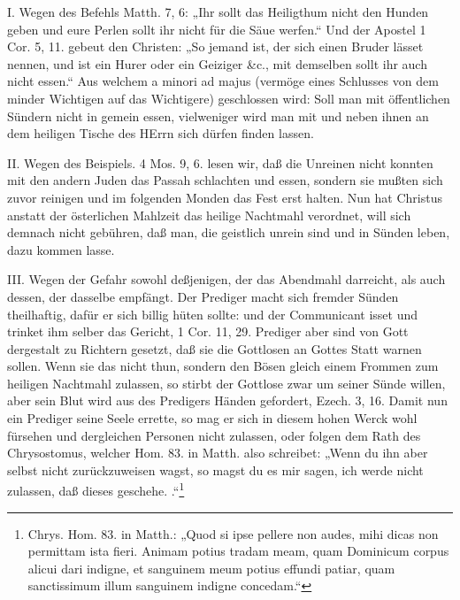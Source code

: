 I. Wegen des Befehls Matth. 7, 6: „Ihr sollt das Heiligthum nicht den Hunden geben und eure Perlen sollt ihr nicht für die Säue werfen.“ Und der Apostel 1 Cor. 5, 11. gebeut den Christen: „So jemand ist, der sich einen Bruder lässet nennen, und ist ein Hurer oder ein Geiziger \&c., mit demselben
sollt ihr auch nicht essen.“ Aus welchem a minori ad majus (vermöge eines Schlusses von dem minder Wichtigen auf das Wichtigere) geschlossen wird: Soll man mit öffentlichen Sündern nicht in gemein essen, vielweniger wird man mit und neben ihnen an dem heiligen Tische des HErrn sich dürfen finden lassen.

II. Wegen des Beispiels. 4 Mos. 9, 6. lesen wir, daß die Unreinen nicht konnten mit den andern Juden das Passah schlachten und essen, sondern sie mußten sich zuvor reinigen und im folgenden Monden das Fest erst halten. Nun hat Christus anstatt der österlichen Mahlzeit das heilige Nachtmahl verordnet, will sich demnach nicht gebühren, daß man, die geistlich unrein sind und in Sünden leben, dazu kommen lasse.

III. Wegen der Gefahr sowohl deßjenigen, der das Abendmahl darreicht, als auch dessen, der dasselbe empfängt. Der Prediger macht sich fremder Sünden theilhaftig, dafür er sich billig hüten sollte: und der Communicant isset und trinket ihm selber das Gericht, 1 Cor. 11, 29. Prediger aber sind von Gott dergestalt zu Richtern gesetzt, daß sie die Gottlosen an Gottes Statt warnen sollen. Wenn sie das nicht thun, sondern den Bösen gleich einem Frommen zum heiligen Nachtmahl zulassen, so stirbt der Gottlose zwar um seiner Sünde willen, aber sein Blut wird aus des Predigers Händen gefordert, Ezech. 3, 16. Damit nun ein Prediger seine Seele errette, so mag er sich in diesem hohen Werck wohl fürsehen und dergleichen Personen nicht zulassen, oder folgen dem Rath des Chrysostomus, welcher Hom. 83. in Matth. also schreibet: „Wenn du ihn aber selbst nicht zurückzuweisen wagst, so magst du es mir sagen, ich werde nicht zulassen, daß dieses geschehe. .“\footnote{Chrys. Hom. 83. in Matth.: „Quod si ipse pellere non audes, mihi dicas non permittam ista fieri. Animam potius tradam meam, quam Dominicum corpus alicui dari indigne, et sanguinem meum potius effundi patiar, quam sanctissimum illum sanguinem indigne concedam.“}


